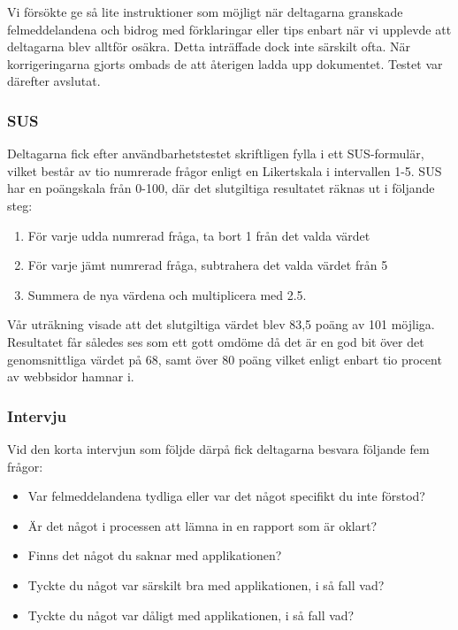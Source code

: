 \documentclass[swedish]{maucsthesis}
\begin{document}
Vi försökte ge så lite instruktioner som möjligt när deltagarna granskade
felmeddelandena och bidrog med förklaringar eller tips enbart när vi upplevde
att deltagarna blev alltför osäkra. Detta inträffade dock inte särskilt ofta.
När korrigeringarna gjorts ombads de att återigen ladda upp dokumentet. Testet
var därefter avslutat.

\subsubsection{SUS}\label{sus}

Deltagarna fick efter användbarhetstestet skriftligen fylla i ett SUS-formulär, vilket består av tio
numrerade frågor enligt en Likertskala i intervallen 1-5. SUS har en poängskala från 0-100, där det
slutgiltiga resultatet räknas ut i följande steg:

\begin{enumerate}
\item För varje udda numrerad fråga, ta bort 1 från det valda värdet
\item För varje jämt numrerad fråga, subtrahera det valda värdet från 5
\item Summera de nya värdena och multiplicera med 2.5.
\end{enumerate}

Vår uträkning visade att det slutgiltiga värdet blev 83,5 poäng av 101 möjliga.
Resultatet får således ses som ett gott omdöme då det är en god bit över det
genomsnittliga värdet på 68, samt över 80 poäng vilket enligt
\cite{laubheimer:2018} enbart tio procent av webbsidor hamnar i.

\subsubsection{Intervju}

Vid den korta intervjun som följde därpå fick deltagarna besvara följande fem
frågor:
\begin{itemize}
\item Var felmeddelandena tydliga eller var det något specifikt du inte förstod?
\item Är det något i processen att lämna in en rapport som är oklart?
\item Finns det något du saknar med applikationen?
\item Tyckte du något var särskilt bra med applikationen, i så fall vad?
\item Tyckte du något var dåligt med applikationen, i så fall vad?
\end{itemize}
\end{document}
